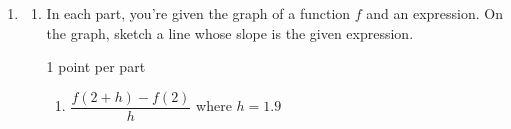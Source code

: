 \documentclass{article}
\begin{document}
\begin{enumerate}
\begin{enumerate}
  \item

    \begin{grading}
      2 points: 1 for the answer, 1 for the explanation. They could,
      of course, also use the definition of derivative to calculate
      $f'(2)$. 
    \end{grading}

    \begin{problem}[\nstretch{1.5}]
      Find $f'(2)$, and explain how you got it. 
    \end{problem}

    \begin{solution}
      Since the graph exhibits even symmetry, 
      we can see that $f'(2)$ (the slope of the tangent line
      at $x = 2$) should be the opposite of $f'(-2)$, so $f'(2) =
      \boxed{- \frac{1}{4}}$. 
    \end{solution}

  \end{enumerate}

\item  \begin{enumerate}
  \item In each part, you're given the graph of a function $f$ and an expression. On the graph, sketch a line whose slope is the given expression.

    \begin{grading}
      1 point per part
    \end{grading}

    \begin{enumerate}
    \item
      \begin{problem}
        $\dfrac{f(2 + h) - f(2)}{h}$ where $h = 1.9$
      \end{problem}




\end{enumerate}
\end{enumerate}
\end{enumerate}
\end{document}
